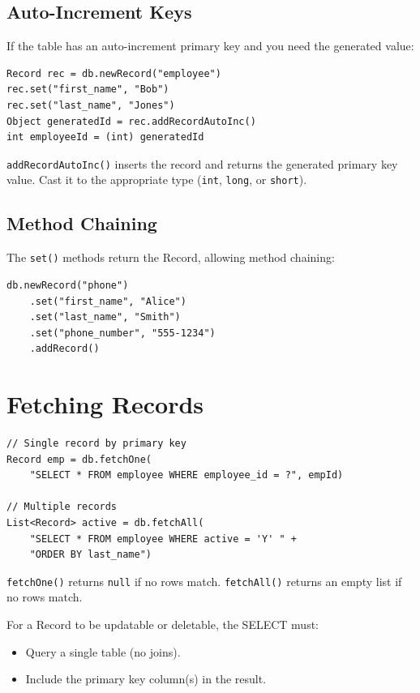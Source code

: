 \subsection{Auto-Increment Keys}

If the table has an auto-increment primary key and you need the generated value:

\begin{lstlisting}[style=groovy]
Record rec = db.newRecord("employee")
rec.set("first_name", "Bob")
rec.set("last_name", "Jones")
Object generatedId = rec.addRecordAutoInc()
int employeeId = (int) generatedId
\end{lstlisting}

\noindent
\texttt{addRecordAutoInc()} inserts the record and returns the generated primary key value.  Cast it to the appropriate type (\texttt{int}, \texttt{long}, or \texttt{short}).

\subsection{Method Chaining}

The \texttt{set()} methods return the Record, allowing method chaining:

\begin{lstlisting}[style=groovy]
db.newRecord("phone")
    .set("first_name", "Alice")
    .set("last_name", "Smith")
    .set("phone_number", "555-1234")
    .addRecord()
\end{lstlisting}

\section{Fetching Records}
\label{sec:crud-fetch}

\begin{lstlisting}[style=groovy]
// Single record by primary key
Record emp = db.fetchOne(
    "SELECT * FROM employee WHERE employee_id = ?", empId)

// Multiple records
List<Record> active = db.fetchAll(
    "SELECT * FROM employee WHERE active = 'Y' " +
    "ORDER BY last_name")
\end{lstlisting}

\noindent
\texttt{fetchOne()} returns \texttt{null} if no rows match.  \texttt{fetchAll()} returns an empty list if no rows match.

\begin{warnbox}
For a Record to be updatable or deletable, the SELECT must:
\begin{itemize}
  \item Query a single table (no joins).
  \item Include the primary key column(s) in the result.
\end{itemize}
\end{warnbox}

